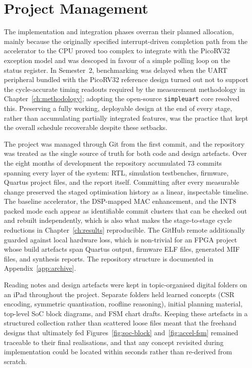 \section{Project Management}

The implementation and integration phases overran their planned allocation,
mainly because the originally specified interrupt-driven completion path
from the accelerator to the CPU proved too complex to integrate with the
PicoRV32 exception model and was descoped in favour of a simple polling loop
on the status register. In Semester~2, benchmarking was delayed when the
UART peripheral bundled with the PicoRV32 reference design turned out not to
support the cycle-accurate timing readouts required by the measurement
methodology in Chapter~\ref{ch:methodology}; adopting the open-source
\texttt{simpleuart} core resolved this. Preserving a fully working,
deployable design at the end of every stage, rather than accumulating
partially integrated features, was the practice that kept the overall
schedule recoverable despite these setbacks.

The project was managed through Git from the first commit, and the
repository was treated as the single source of truth for both code and
design artefacts. Over the eight months of development the repository
accumulated 73 commits spanning every layer of the system: RTL,
simulation testbenches, firmware, Quartus project files, and the
report itself. Committing after every measurable change preserved the
staged optimisation history as a linear, inspectable timeline. The
baseline accelerator, the DSP-mapped MAC enhancement, and the INT8
packed mode each appear as identifiable commit clusters that can be
checked out and rebuilt independently, which is also what makes the
stage-to-stage cycle reductions in Chapter~\ref{ch:results}
reproducible. The GitHub remote additionally guarded against local
hardware loss, which is non-trivial for an FPGA project whose build
artefacts span Quartus output, firmware ELF files, generated MIF
files, and synthesis reports. The repository structure is documented
in Appendix~\ref{app:archive}.

Reading notes and design artefacts were kept in topic-organised
digital folders on an iPad throughout the project. Separate folders
held learned concepts (CSR encoding, symmetric quantisation, roofline
reasoning), initial planning material, top-level SoC block diagrams,
and FSM chart drafts. Keeping these artefacts in a structured
collection rather than scattered loose files meant that the freehand
designs that ultimately fed Figures~\ref{fig:soc-block}
and~\ref{fig:accel-fsm} remained traceable to their final realisations,
and that any concept revisited during implementation could be located
within seconds rather than re-derived from scratch.

